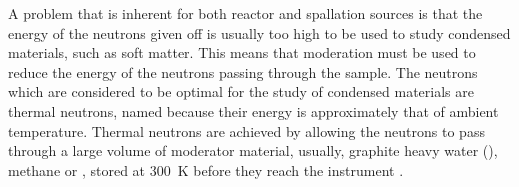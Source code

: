 A problem that is inherent for both reactor and spallation sources is that the energy of the neutrons given off is usually too high to be used to study condensed materials, such as soft matter.
This means that moderation must be used to reduce the energy of the neutrons passing through the sample.
The neutrons which are considered to be optimal for the study of condensed materials are thermal neutrons, named because their energy is approximately that of ambient temperature.
Thermal neutrons are achieved by allowing the neutrons to pass through a large volume of moderator material, usually, graphite heavy water (), methane or , stored at \SI{300}{\kelvin} before they reach the instrument \cite{sivia_elementary_2011}.
